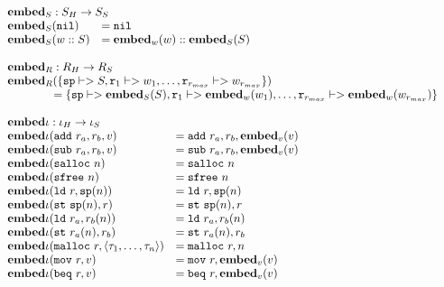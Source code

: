 {\[\begin{array}{l}
\begin{array}{ll}
\rlap{$\embed_S : \high S -> \simple{S}$} \\
\embed_S(\mathtt{nil}) &= \mathtt{nil} \\
\embed_S(w :: S) &= \embed_w(w) :: \embed_S(S) \\
\end{array} \\\\

\begin{array}{l}
\embed_R : \high R -> \simple{R} \\
\embed_R(\{\mathtt{sp} |-> S, \mathtt{r}_1 |-> w_1, \dots, \mathtt{r}_{r_{max}} |-> w_{r_{max}}\})\\
\quad\quad\quad\quad = \{\mathtt{sp} |-> \embed_S(S), \mathtt{r}_1 |-> \embed_w(w_1), \dots, \mathtt{r}_{r_{max}} |-> \embed_w(w_{r_{max}})\}
\end{array} \\\\

\begin{array}{ll}
\rlap{$\embed{\iota} : \high\iota -> \simple\iota$} \\
\embed{\iota}(\mathtt{add}\ r_a, r_b, v) &= \mathtt{add}\ r_a, r_b, \embed_v(v) \\
\embed{\iota}(\mathtt{sub}\ r_a, r_b, v) &= \mathtt{sub}\ r_a, r_b, \embed_v(v) \\
\embed{\iota}(\mathtt{salloc}\ n) &= \mathtt{salloc}\ n \\
\embed{\iota}(\mathtt{sfree}\ n) &= \mathtt{sfree}\ n \\
\embed{\iota}(\mathtt{ld}\ r, \mathtt{sp}(n)) &= \mathtt{ld}\ r, \mathtt{sp}(n) \\
\embed{\iota}(\mathtt{st}\ \mathtt{sp}(n), r) &= \mathtt{st}\ \mathtt{sp}(n), r \\
\embed{\iota}(\mathtt{ld}\ r_a, r_b(n)) &= \mathtt{ld}\ r_a, r_b(n) \\
\embed{\iota}(\mathtt{st}\ r_a(n), r_b) &= \mathtt{st}\ r_a(n), r_b \\
\embed{\iota}(\mathtt{malloc}\ r, \langle \tau_1, \dots, \tau_n \rangle) &= \mathtt{malloc}\ r, n \\
\embed{\iota}(\mathtt{mov}\ r, v) &= \mathtt{mov}\ r, \embed_v(v) \\
\embed{\iota}(\mathtt{beq}\ r, v) &= \mathtt{beq}\ r, \embed_v(v) \\
\end{array} \\\\


\end{array}\]}
